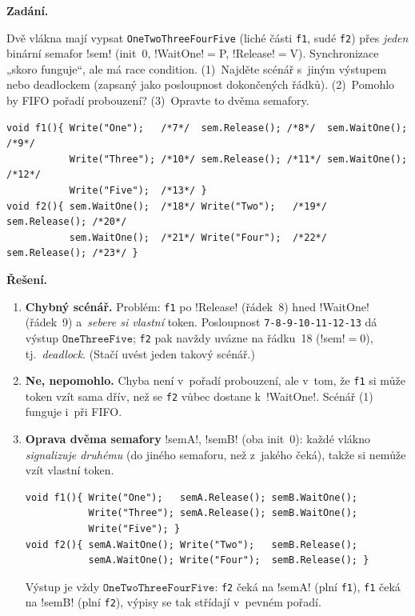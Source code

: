 \begin{priklad}
\par
\textbf{Zadání.}\par
Dvě vlákna mají vypsat \texttt{OneTwoThreeFourFive} (liché části \texttt{f1}, sudé \texttt{f2}) přes \emph{jeden} binární semafor \cd!sem! (init~0, \cd!WaitOne!$=$P, \cd!Release!$=$V). Synchronizace „skoro funguje``, ale má race condition. (1)~Najděte scénář s~jiným výstupem nebo deadlockem (zapsaný jako posloupnost dokončených řádků). (2)~Pomohlo by FIFO pořadí probouzení? (3)~Opravte to dvěma semafory.
\begin{lstlisting}[language={[Sharp]C}]
void f1(){ Write("One");   /*7*/  sem.Release(); /*8*/  sem.WaitOne(); /*9*/
           Write("Three"); /*10*/ sem.Release(); /*11*/ sem.WaitOne(); /*12*/
           Write("Five");  /*13*/ }
void f2(){ sem.WaitOne();  /*18*/ Write("Two");   /*19*/ sem.Release(); /*20*/
           sem.WaitOne();  /*21*/ Write("Four");  /*22*/ sem.Release(); /*23*/ }
\end{lstlisting}

\medskip
\textbf{Řešení.}\par
\begin{enumerate}[label=(\arabic*)]
\item \textbf{Chybný scénář.} Problém: \texttt{f1} po \cd!Release! (řádek~8) hned \cd!WaitOne! (řádek~9) a~\emph{sebere si vlastní} token. Posloupnost \texttt{7-8-9-10-11-12-13} dá výstup $\boxed{\texttt{OneThreeFive}}$; \texttt{f2} pak navždy uvázne na řádku~18 (\cd!sem!$=0$), tj.\ \emph{deadlock}. (Stačí uvést jeden takový scénář.)
\item \textbf{Ne, nepomohlo.} Chyba není v~pořadí probouzení, ale v~tom, že \texttt{f1} si může token vzít sama dřív, než se \texttt{f2} vůbec dostane k~\cd!WaitOne!. Scénář (1) funguje i~při FIFO.
\item \textbf{Oprava dvěma semafory} \cd!semA!, \cd!semB! (oba init~0): každé vlákno \emph{signalizuje druhému} (do jiného semaforu, než z~jakého čeká), takže si nemůže vzít vlastní token.
\begin{lstlisting}[language={[Sharp]C}]
void f1(){ Write("One");   semA.Release(); semB.WaitOne();
           Write("Three"); semA.Release(); semB.WaitOne();
           Write("Five"); }
void f2(){ semA.WaitOne(); Write("Two");   semB.Release();
           semA.WaitOne(); Write("Four");  semB.Release(); }
\end{lstlisting}
Výstup je vždy $\boxed{\texttt{OneTwoThreeFourFive}}$: \texttt{f2} čeká na \cd!semA! (plní \texttt{f1}), \texttt{f1} čeká na \cd!semB! (plní \texttt{f2}), výpisy se tak střídají v~pevném pořadí.
\end{enumerate}
\end{priklad}

